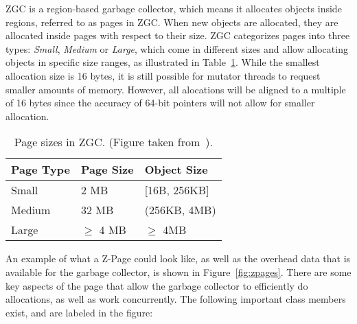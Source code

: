\label{background:zpages}
ZGC is a region-based garbage collector, which means it allocates objects inside regions, referred to as pages in ZGC. When new objects are allocated, they are allocated inside pages with respect to their size. ZGC categorizes pages into three types: \textit{Small}, \textit{Medium} or \textit{Large}, which come in different sizes and allow allocating objects in specific size ranges, as illustrated in Table~\ref{table:zpage_sizes}. While the smallest allocation size is 16 bytes, it is still possible for mutator threads to request smaller amounts of memory. However, all alocations will be aligned to a multiple of 16 bytes since the accuracy of 64-bit pointers will not allow for smaller allocation.

\begin{table}[H]
    \centering
    \begin{tabular}{lllll}
        \hline
        Page Type & Page Size          & \multicolumn{3}{l}{Object Size}        \\ \hline
        Small     & 2 MB                & \multicolumn{3}{l}{{[}16B, 256KB{]}}   \\
        Medium    & 32 MB               & \multicolumn{3}{l}{(256KB, 4MB)}       \\
        Large     & $\geq$ 4 MB & \multicolumn{3}{l}{$\geq$ 4MB} \\ \hline
    \end{tabular}
    \caption{Page sizes in ZGC. (Figure taken from~\cite{zpage_size_table}). }
    \label{table:zpage_sizes}
\end{table}

An example of what a Z-Page could look like, as well as the overhead data that is available for the garbage collector, is shown in Figure~\ref{fig:zpages}. There are some key aspects of the page that allow the garbage collector to efficiently do allocations, as well as work concurrently. The following important class members exist, and are labeled in the figure:

